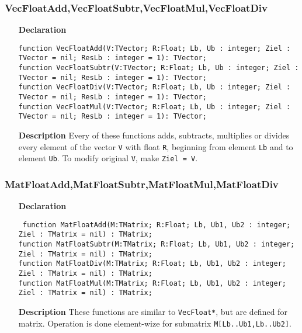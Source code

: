 \documentclass[12pt,a4paper,oneside]{report}
\newcommand{\declarationitem}[1]{\textbf{#1}}
\newcommand{\descriptiontitle}[1]{\textbf{#1}}
\newcommand{\code}[1]{\texttt{#1}}
\begin{document}
\subsubsection{VecFloatAdd,VecFloatSubtr,VecFloatMul,VecFloatDiv}
\label{VecFloatAdd}
\begin{itemize}
	\item[\declarationitem{Declaration}\hfill]
	\begin{flushleft}
	\code{function VecFloatAdd(V:TVector; R:Float; Lb, Ub : integer; 
		Ziel : TVector = nil; ResLb : integer = 1): TVector;\\
	function VecFloatSubtr(V:TVector; R:Float; Lb, Ub : integer; 
	Ziel : TVector = nil; ResLb : integer = 1): TVector;\\
	function VecFloatDiv(V:TVector; R:Float; Lb, Ub : integer; 
	Ziel : TVector = nil; ResLb : integer = 1): TVector;\\
	function VecFloatMul(V:TVector; R:Float; Lb, Ub : integer;  
	Ziel : TVector = nil; ResLb : integer = 1): TVector;}
	\end{flushleft}
	\item[\descriptiontitle{Description}]
	Every of these functions adds, subtracts, multiplies or divides every element of the vector \code{V} with float \code{R}, beginning from element \code{Lb} and to element \code{Ub}. To modify original \code{V}, make \code{Ziel = V}. 
\end{itemize} 
\subsubsection{MatFloatAdd,MatFloatSubtr,MatFloatMul,MatFloatDiv}
\label{MatFloatDiv}
\begin{itemize}
	\item[\declarationitem{Declaration}\hfill]\begin{flushleft}
\code{	function MatFloatAdd(M:TMatrix; R:Float; Lb, Ub1, Ub2 : integer; Ziel : TMatrix = nil) : TMatrix;}\\
	\code{function MatFloatSubtr(M:TMatrix; R:Float; Lb, Ub1, Ub2 : integer; Ziel : TMatrix = nil) : TMatrix;}\\
	\code{function MatFloatDiv(M:TMatrix; R:Float; Lb, Ub1, Ub2 : integer; Ziel : TMatrix = nil) : TMatrix;}\\
	\code{function MatFloatMul(M:TMatrix; R:Float; Lb, Ub1, Ub2 : integer; Ziel : TMatrix = nil) : TMatrix;}
	\end{flushleft}
	\item[\descriptiontitle{Description}]These functions are similar to \code{VecFloat*}, but are defined for matrix. Operation is done element-wize for submatrix \code{M[Lb..Ub1,Lb..Ub2]}.
\end{itemize}
\end{document}
